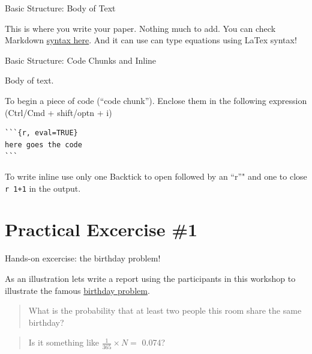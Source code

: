 \begin{frame}[fragile]{Basic Structure: Body of Text}

\begin{Shaded}
\begin{Highlighting}[]
\OperatorTok{---}
\OperatorTok{---}
\end{Highlighting}
\end{Shaded}

This is where you write your paper. Nothing much to add. You can check
Markdown
\href{https://www.rstudio.com/wp-content/uploads/2015/02/rmarkdown-cheatsheet.pdf}{syntax
here}. And it can use can type equations using LaTex syntax!

\end{frame}

\begin{frame}[fragile]{Basic Structure: Code Chunks and Inline}

\begin{Shaded}
\begin{Highlighting}[]
\OperatorTok{---}
\OperatorTok{---}
\end{Highlighting}
\end{Shaded}

Body of text.

To begin a piece of code (``code chunk''). Enclose them in the following
expression (Ctrl/Cmd + shift/optn + i)

\begin{verbatim}
```{r, eval=TRUE}
here goes the code
```
\end{verbatim}

To write inline use only one Backtick to open followed by an ``r''" and
one to close \texttt{\textasciigrave{}r\ 1+1\textasciigrave{}} in the
output.

\end{frame}

\section{Practical Excercise \#1}\label{practical-excercise-1}

\begin{frame}{Hands-on excercise: the birthday problem!}

As an illustration lets write a report using the participants in this
workshop to illustrate the famous
\href{https://en.wikipedia.org/wiki/Birthday_problem}{birthday problem}.

\begin{quote}
What is the probability that at least two people this room share the
same birthday?
\end{quote}

\begin{quote}
Is it something like \(\frac{1}{365} \times N =\) 0.074?
\end{quote}

\end{frame}

